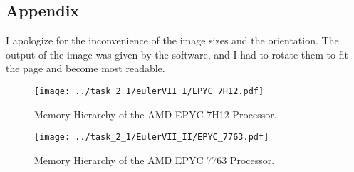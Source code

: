 \documentclass[unicode,11pt,a4paper,oneside,numbers=endperiod,openany]{scrartcl}
\begin{document}


\subsection*{Appendix}
I apologize for the inconvenience of the image sizes and the orientation. The output of the image
was given by the software, and I had to rotate them to fit the page and become most readable.

\begin{figure}[htbp]
    \centering
    \texttt{[image: ../task\_2\_1/eulerVII\_I/EPYC\_7H12.pdf]}
    \caption{Memory Hierarchy of the AMD EPYC 7H12 Processor.}
\label{fig:7H12_processor}
\end{figure}


\begin{figure}[htbp]
    \centering
    \texttt{[image: ../task\_2\_1/EulerVII\_II/EPYC\_7763.pdf]}
    \caption{Memory Hierarchy of the AMD EPYC 7763 Processor.}
\label{fig:7763_processor}
\end{figure}
\end{document}
